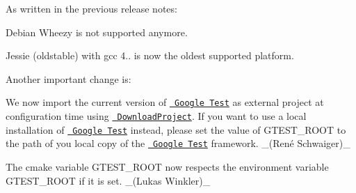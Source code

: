 As written in the previous release notes\+:


\begin{DoxyItemize}
\item Debian Wheezy is not supported anymore.
\item Jessie (oldstable) with gcc 4.. is now the oldest supported platform.
\end{DoxyItemize}

Another important change is\+:


\begin{DoxyItemize}
\item We now import the current version of \href{https://github.com/google/googletest}{\texttt{ Google Test}} as external project at configuration time using \href{https://github.com/Crascit/DownloadProject}{\texttt{ Download\+Project}}. If you want to use a local installation of \href{https://github.com/google/googletest}{\texttt{ Google Test}} instead, please set the value of {\ttfamily G\+T\+E\+S\+T\+\_\+\+R\+O\+OT} to the path of you local copy of the \href{https://github.com/google/googletest}{\texttt{ Google Test}} framework. \+\_\+(René Schwaiger)\+\_\+
\item The cmake variable {\ttfamily G\+T\+E\+S\+T\+\_\+\+R\+O\+OT} now respects the environment variable {\ttfamily G\+T\+E\+S\+T\+\_\+\+R\+O\+OT} if it is set. \+\_\+(\+Lukas Winkler)\+\_\+
\end{DoxyItemize}


